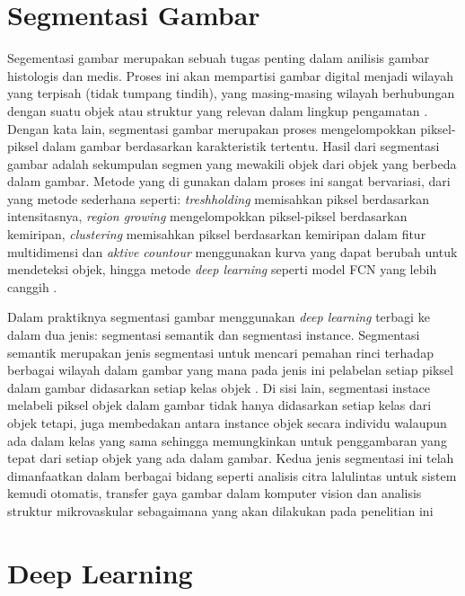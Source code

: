  
\section{Segmentasi Gambar}

\noindent Segementasi gambar merupakan sebuah tugas penting dalam anilisis gambar histologis dan medis. Proses ini akan mempartisi gambar digital menjadi wilayah yang terpisah (tidak tumpang tindih), yang masing-masing wilayah  berhubungan dengan suatu objek atau struktur yang relevan dalam lingkup pengamatan \cite{wu_image_2023}. Dengan kata lain, segmentasi gambar merupakan proses mengelompokkan piksel-piksel dalam gambar berdasarkan karakteristik tertentu. Hasil dari segmentasi gambar adalah sekumpulan segmen yang mewakili objek dari objek yang berbeda dalam gambar. Metode yang di gunakan dalam proses ini sangat bervariasi, dari yang metode sederhana seperti: \textit{treshholding} memisahkan piksel berdasarkan intensitasnya, \textit{region growing} mengelompokkan piksel-piksel berdasarkan kemiripan, \textit{clustering} memisahkan piksel berdasarkan kemiripan dalam fitur multidimensi dan \textit{aktive countour} menggunakan kurva yang dapat berubah untuk mendeteksi objek, hingga metode \textit{deep learning} seperti model FCN yang lebih canggih \cite{huang_fully_2022,wang_comprehensive_2022}.

\noindent Dalam praktiknya segmentasi gambar menggunakan \textit{deep learning} terbagi ke dalam dua jenis: segmentasi semantik dan segmentasi instance. Segmentasi semantik merupakan jenis segmentasi untuk mencari pemahan rinci terhadap berbagai wilayah dalam gambar yang mana pada jenis ini pelabelan setiap piksel dalam gambar didasarkan setiap kelas objek \cite{fan_image_2023}. Di sisi lain, segmentasi instace melabeli piksel objek dalam gambar tidak hanya didasarkan setiap kelas dari objek tetapi, juga membedakan antara instance objek  secara individu walaupun ada dalam kelas yang sama sehingga memungkinkan untuk penggambaran yang tepat dari setiap objek yang ada dalam gambar. Kedua jenis segmentasi ini telah dimanfaatkan dalam berbagai bidang seperti analisis citra lalulintas untuk sistem kemudi otomatis, transfer gaya gambar dalam komputer vision dan analisis struktur mikrovaskular sebagaimana yang akan dilakukan pada penelitian ini \cite{wang_traffic_2023, zhang_image_2023, sultan_microvasculature_2023}


\section{Deep Learning}


